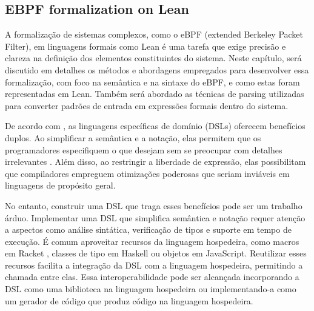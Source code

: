 \documentclass[sigconf]{acmart}
\begin{document}



\subsection{EBPF formalization on Lean}

A formalização de sistemas complexos, como o eBPF (extended Berkeley Packet Filter), em linguagens formais como Lean é uma tarefa que exige precisão e clareza na definição dos elementos constituintes do sistema. Neste capítulo, será discutido em detalhes os métodos e abordagens empregados para desenvolver essa formalização, com foco na semântica e na sintaxe do eBPF, e como estas foram representadas em Lean. Também será abordado as técnicas de parsing utilizadas para converter padrões de entrada em expressões formais dentro do sistema.

De acordo com \cite{walia2020sham}, as linguagens específicas de domínio (DSLs) oferecem benefícios duplos. Ao simplificar a semântica e a notação, elas permitem que os programadores especifiquem o que desejam sem se preocupar com detalhes irrelevantes \cite{perlis1982special}. Além disso, ao restringir a liberdade de expressão, elas possibilitam que compiladores empreguem otimizações poderosas que seriam inviáveis em linguagens de propósito geral.

No entanto, construir uma DSL que traga esses benefícios pode ser um trabalho árduo. Implementar uma DSL que simplifica semântica e notação requer atenção a aspectos como análise sintática, verificação de tipos e suporte em tempo de execução. É comum aproveitar recursos da linguagem hospedeira, como macros em Racket \cite{flatt2010reference}, classes de tipo em Haskell ou objetos em JavaScript. Reutilizar esses recursos facilita a integração da DSL com a linguagem hospedeira, permitindo a chamada entre elas. Essa interoperabilidade pode ser alcançada incorporando a DSL como uma biblioteca na linguagem hospedeira ou implementando-a como um gerador de código que produz código na linguagem hospedeira.
\end{document}
